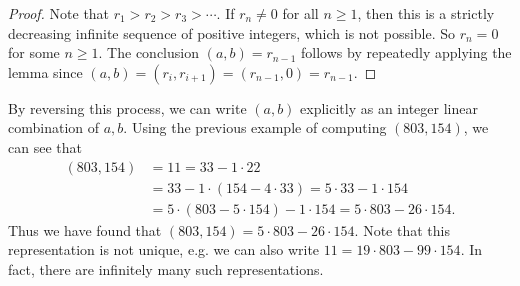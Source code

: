 \begin{proof}
  Note that $r_1 > r_2 > r_3 > \cdots$.
  If $r_n \ne 0$ for all $n \ge 1$, then
  this is a strictly decreasing infinite
  sequence of positive integers, which
  is not possible. So $r_n = 0$ for some
  $n \ge 1$. The conclusion
  $(a, b) = r_{n - 1}$ follows by repeatedly
  applying the lemma since
  $(a, b) = (r_i, r_{i + 1}) = (r_{n - 1}, 0) = r_{n - 1}$.
\end{proof}

\begin{example}
  By reversing this process, we can
  write $(a, b)$ explicitly as an integer
  linear combination of $a, b$.
  Using the previous example of computing
  $(803, 154)$, we can see that
  \begin{align*}
    (803, 154)
    &= 11
    = 33 - 1 \cdot 22 \\
    &= 33 - 1 \cdot (154 - 4 \cdot 33)
    = 5 \cdot 33 - 1 \cdot 154 \\
    &= 5 \cdot (803 - 5 \cdot 154) - 1 \cdot 154
    = 5 \cdot 803 - 26 \cdot 154.
  \end{align*}
  Thus we have found that
  $(803, 154) = 5 \cdot 803 - 26 \cdot 154$.
  Note that this representation
  is not unique, e.g.
  we can also write
  $11 = 19 \cdot 803 - 99 \cdot 154$.
  In fact, there are infinitely many such
  representations.
\end{example}
